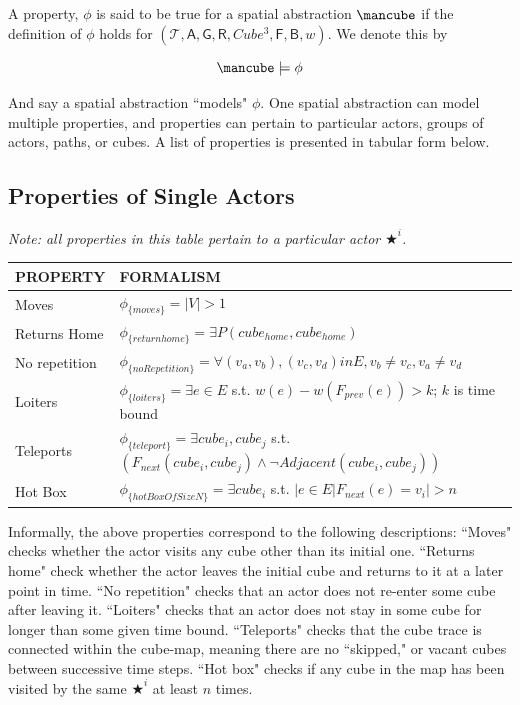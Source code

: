 A property, $\phi$ is said to be true for a spatial abstraction $\cube$ if the definition of $\phi$ holds for $(\mathcal{T}, \mathsf{A}, \mathsf{G}, \mathsf{R}, Cube^3, \mathsf{F}, \mathsf{B}, w)$.
We denote this by 

\begin{equation}
  \cube \models \phi
\end{equation}

And say a spatial abstraction ``models" $\phi$.
One spatial abstraction can model multiple properties, and properties can pertain to particular actors, groups of actors, paths, or cubes.
A list of properties is presented in tabular form below.

\subsection{Properties of Single Actors}

\emph{Note: all properties in this table pertain to a particular actor $\bigstar^i$.}
\begin{tabular}{| p{2.8cm} | p{11.5cm} | }
\hline
PROPERTY & FORMALISM \\ \hline
Moves & $\phi_{\{moves\}} = |V| > 1$ \\ \hline
Returns Home & $\phi_{\{returnhome\}} = \exists P(cube_{home}, cube_{home})$ \\ \hline
No repetition & $\phi_{\{noRepetition\}} = \forall (v_a, v_b), (v_c,v_d) in E, v_b \neq v_c, v_a \neq v_d$ \\ \hline
Loiters & $\phi_{\{loiters\}} =  \exists e \in E$ s.t. $w(e) - w(F_{prev}(e)) > k$; $k$ is time bound \\ \hline
 Teleports & $\phi_{\{teleport\}}=  \exists  cube_i, cube_j$ s.t. $ (F_{next}(cube_i, cube_j) \land \lnot Adjacent(cube_i, cube_j))$ \\ \hline
 Hot Box & $\phi_{\{hotBoxOfSizeN\}} = \exists cube_i$ s.t. $ |{e \in E | F_{next}(e) = v_i}| > n$ \\ \hline
\end{tabular}

Informally, the above properties correspond to the following descriptions:
``Moves" checks whether the actor visits any cube other than its initial one.
``Returns home" check whether the actor leaves the initial cube and returns to it at a later point in time.
``No repetition" checks that an actor does not re-enter some cube after leaving it.
``Loiters" checks that an actor does not stay in some cube for longer than some given time bound.
``Teleports" checks that the cube trace is connected within the cube-map, meaning there are no ``skipped," or vacant cubes between successive time steps.
``Hot box" checks if any cube in the map has been visited by the same $\bigstar^i$ at least $n$ times.


